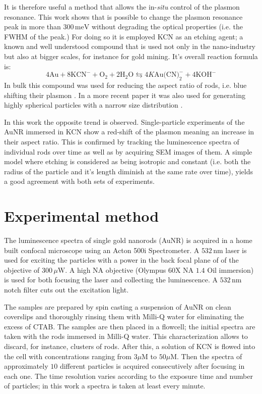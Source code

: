 \documentclass{article}
\begin{document}
It is therefore useful a method that allows the in-\textit{situ} control of the
plasmon resonance. This work shows that is possible to change the plasmon
resonance peak in more than $300\,\textrm{meV}$ without degrading the optical
properties (i.e. the FWHM of the peak.) For doing so it is employed KCN as an
etching agent; a known and well understood compound that is used not only in the
nano-industry but also at bigger scales, for instance for gold mining. It's
overall reaction formula is:
\begin{equation*}
4\textrm{Au} + 8\textrm{KCN}^-+\textrm{O}_2 + 2\textrm{H}_2\textrm{O}
\leftrightarrows 4K\textrm{Au(CN)}_2^-+4\textrm{KOH}^-
\end{equation*}
In bulk this compound was used for reducing the aspect ratio of rods, i.e.
blue shifting their plasmon \cite{Jana2002}. In a more recent paper it was also
used for generating highly spherical particles with a narrow size
distribution \cite{Lee2013}.

In this work the opposite trend is observed. Single-particle experiments of the
AuNR immersed in KCN show a red-shift of the plasmon meaning an increase in
their aspect ratio. This is confirmed by tracking the luminescence spectra of
individual rods over time as well as by acquiring SEM images of them. A simple
model where etching is considered as being isotropic and constant (i.e. both the
radius of the particle and it's length diminish at the same rate over time),
yields a good agreement with both sets of experiments.

\section{Experimental method}
The luminescence spectra of single gold nanorods (AuNR) is acquired in a home
built confocal microscope using an Acton 500i Spectrometer. A $532\,\textrm{nm}$
laser is used for exciting the particles with a power in the back focal plane of
of the objective of $300\,\mu\textrm{W}$. A high NA objective (Olympus $60$X NA
$1.4$ Oil immersion) is used for both focusing the laser and collecting the
luminescence. A $532\,\textrm{nm}$ notch filter cuts out the excitation light.

The samples are prepared by spin casting a suspension of AuNR on clean
coverslips and thoroughly rinsing them  with Milli-Q water for eliminating the
excess of CTAB. The samples are then placed in a flowcell; the initial spectra
are taken with the rods immersed in Milli-Q water. This characterization allows
to discard, for instance, clusters of rods. After this, a solution of KCN is
flowed into the cell with concentrations ranging from $3\mu\textrm{M}$ to
$50\mu\textrm{M}$. Then the spectra of approximately $10$ different particles is
acquired consecutively after focusing in each one. The time resolution varies
according to the exposure time and number of particles; in this work a spectra
is taken at least every minute.
\end{document}
